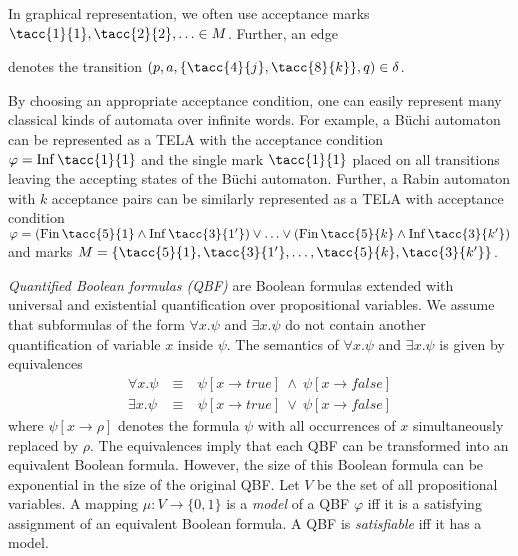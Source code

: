 \documentclass[a4paper,UKenglish,cleveref,autoref,thm-restate]{lipics-v2021}
\DeclareMathOperator{\Inf}{\mathsf{Inf}}
\DeclareMathOperator{\Fin}{\mathsf{Fin}}
\def\false{\mathit{false}}
\def\true{\mathit{true}}
\begin{document}
In graphical representation, we often use acceptance marks
$\tacc{1}{1},\tacc{2}{2},\ldots\in M$. Further, an edge 
denotes the transition $(p,a,\{\tacc{4}{j},\tacc{8}{k}\},q)\in\delta$. 

By choosing an appropriate acceptance condition, one can easily
represent many classical kinds of automata over infinite words. For
example, a Büchi automaton can be represented as a TELA with the
acceptance condition $\varphi = \Inf\tacc{1}{1}$ and the single mark
$\tacc{1}{1}$ placed on all transitions leaving the accepting states
of the Büchi automaton. Further, a Rabin automaton with $k$ acceptance
pairs can be similarly represented as a TELA with acceptance condition
$\varphi = (\Fin\tacc{5}{1} \land \Inf\tacc{3}{1'}) \lor \ldots \lor
(\Fin\tacc{5}{k} \land \Inf\tacc{3}{k'})$ and marks
$M = \{\tacc{5}{1}, \tacc{3}{1'}, \ldots, \tacc{5}{k},
\tacc{3}{k'}\}$.

\bigskip

\emph{Quantified Boolean formulas (QBF)} are Boolean formulas
extended with universal and existential quantification over
propositional variables. We assume that subformulas of the form
$\forall x.\psi$ and $\exists x.\psi$ do not contain another
quantification of variable $x$ inside $\psi$. The semantics of
$\forall x.\psi$ and $\exists x.\psi$ is given by equivalences
\[
  \begin{array}{rcl}
    \forall x.\psi &~\equiv~& \psi[x\rightarrow\true]~\wedge~\psi[x\rightarrow\false]\\
    \exists x.\psi &~\equiv~& \psi[x\rightarrow\true]~\vee~   \psi[x\rightarrow\false]
  \end{array}
\]
where $\psi[x\rightarrow \rho]$ denotes the formula $\psi$ with all
occurrences of $x$ simultaneously replaced by $\rho$. The equivalences
imply that each QBF can be transformed into an equivalent Boolean
formula. However, the size of this Boolean formula can be exponential
in the size of the original QBF. Let $V$ be the set of all
propositional variables. A mapping $\mu:V\rightarrow\{0,1\}$
is a \emph{model} of a QBF $\varphi$ iff it is a satisfying
assignment of an equivalent Boolean formula. A QBF is
\emph{satisfiable} iff it has a model.
\end{document}
